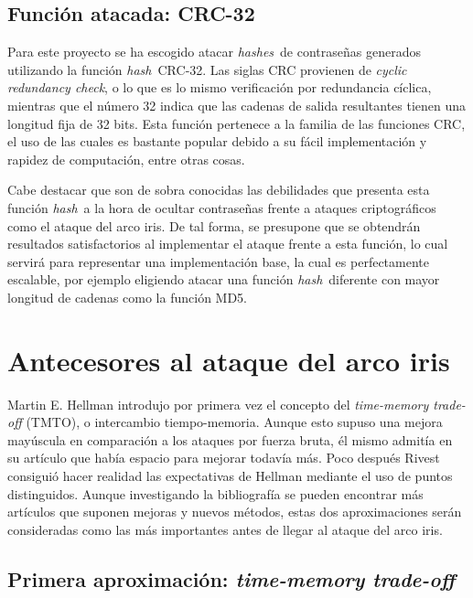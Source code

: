 \documentclass[12pt,spanish,listoffigures,listoftables]{tfgetsinf}
\newcommand{\hash}{\textit{hash}}
\newcommand{\hashes}{\textit{hashes}}
\begin{document}
\section{Función atacada: CRC-32} \label{crc32}

Para este proyecto se ha escogido atacar \hashes~de contraseñas generados utilizando la función \hash~CRC-32. Las siglas CRC provienen de \textit{cyclic redundancy check}, o lo que es lo mismo verificación por redundancia cíclica, mientras que el número 32 indica que las cadenas de salida resultantes tienen una longitud fija de 32 bits. Esta función pertenece a la familia de las funciones CRC, el uso de las cuales es bastante popular debido a su fácil implementación y rapidez de computación, entre otras cosas.

Cabe destacar que son de sobra conocidas las debilidades que presenta esta función \hash~a la hora de ocultar contraseñas frente a ataques criptográficos como el ataque del arco iris. De tal forma, se presupone que se obtendrán resultados satisfactorios al implementar el ataque frente a esta función, lo cual servirá para representar una implementación base, la cual es perfectamente escalable, por ejemplo eligiendo atacar una función \hash~diferente con mayor longitud de cadenas como la función MD5.

\chapter{Antecesores al ataque del arco iris}

Martin E. Hellman \cite{hellman} introdujo por primera vez el concepto del \textit{time-memory trade-off} (TMTO), o intercambio tiempo-memoria. Aunque esto supuso una mejora mayúscula en comparación a los ataques por fuerza bruta, él mismo admitía en su artículo que había espacio para mejorar todavía más. Poco después Rivest \cite{rivest} consiguió hacer realidad las expectativas de Hellman mediante el uso de puntos distinguidos. Aunque investigando la bibliografía se pueden encontrar más artículos que suponen mejoras y nuevos métodos, estas dos aproximaciones serán consideradas como las más importantes antes de llegar al ataque del arco iris.
~\\

\section{Primera aproximación: \textit{time-memory trade-off}} \label{tmto}
\end{document}
